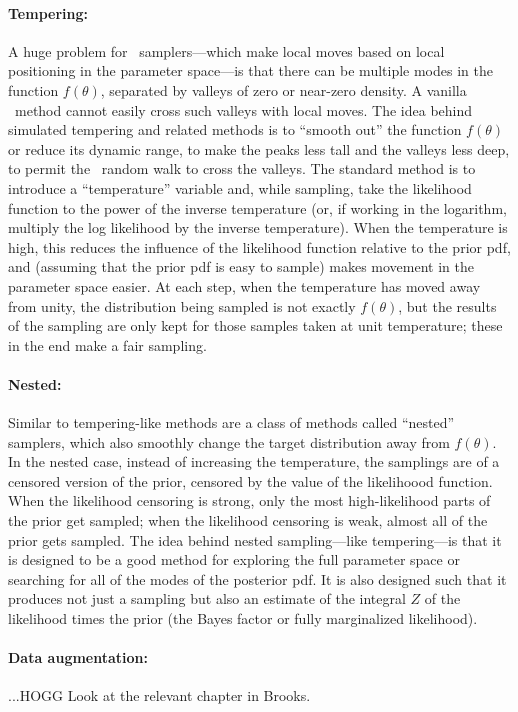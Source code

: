 \documentclass[12pt,twoside,pdftex]{article}
\newcommand{\MCMC}{\acronym{MCMC}}
\newcommand{\pars}{\theta}
\begin{document}
\paragraph{Tempering:}
A huge problem for \MCMC\ samplers---which make local moves based on
local positioning in the parameter space---is that there can be
multiple modes in the function $f(\pars)$, separated by valleys of
zero or near-zero density.
A vanilla \MCMC\ method cannot easily cross such valleys with local
moves.
The idea behind simulated tempering and related methods is to ``smooth
out'' the function $f(\pars)$ or reduce its dynamic range, to make the
peaks less tall and the valleys less deep, to permit the \MCMC\ random
walk to cross the valleys.
The standard method is to introduce a ``temperature'' variable and,
while sampling, take the likelihood function to the power of the
inverse temperature (or, if working in the logarithm, multiply the log
likelihood by the inverse temperature).
When the temperature is high, this reduces the influence of the
likelihood function relative to the prior pdf, and (assuming that the
prior pdf is easy to sample) makes movement in the parameter space
easier.
At each step, when the temperature has moved away from unity, the
distribution being sampled is not exactly $f(\pars)$, but the results
of the sampling are only kept for those samples taken at unit
temperature; these in the end make a fair sampling.

\paragraph{Nested:}
Similar to tempering-like methods are a class of methods called ``nested''
samplers, which also smoothly change the target distribution away from $f(\pars)$.
In the nested case, instead of increasing the temperature, the
samplings are of a censored version of the prior, censored by the
value of the likelihoood function.
When the likelihood censoring is strong, only the most high-likelihood
parts of the prior get sampled; when the likelihood censoring is weak,
almost all of the prior gets sampled.
The idea behind nested sampling---like tempering---is that it is
designed to be a good method for exploring the full parameter space or
searching for all of the modes of the posterior pdf.
It is also designed such that it produces not just a sampling but also
an estimate of the integral $Z$ of the likelihood times the prior
(the Bayes factor or fully marginalized likelihood).

\paragraph{Data augmentation:}
...HOGG Look at the relevant chapter in Brooks.
\end{document}
